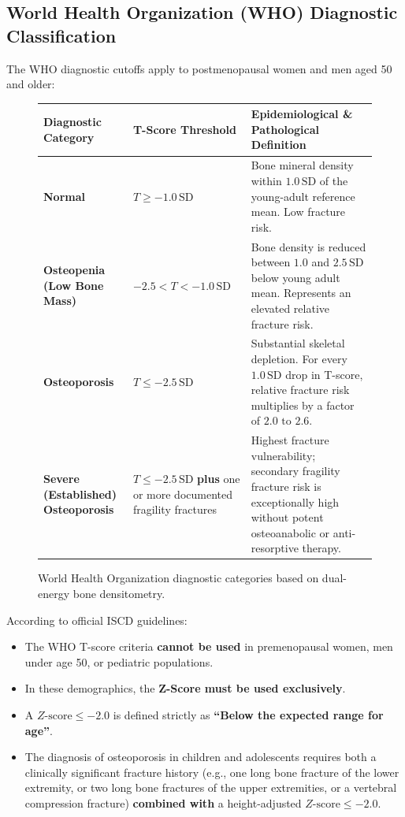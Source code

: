 \documentclass[11pt,a4paper]{article}
\begin{document}
\subsection{World Health Organization (WHO) Diagnostic Classification}

The WHO diagnostic cutoffs apply to postmenopausal women and men aged 50 and older:

\begin{figure}[htbp]
\centering
\setlength{\tabcolsep}{4pt}
\begin{tabular}{p{3.8cm}p{4.2cm}p{6.6cm}}
\toprule
\textbf{Diagnostic Category} & \textbf{T-Score Threshold} & \textbf{Epidemiological \& Pathological Definition} \\
\midrule
\textbf{Normal} & $T \ge -1.0\,\text{SD}$ & Bone mineral density within $1.0\,\text{SD}$ of the young-adult reference mean. Low fracture risk. \\
\addlinespace
\textbf{Osteopenia (Low Bone Mass)} & $-2.5 < T < -1.0\,\text{SD}$ & Bone density is reduced between $1.0$ and $2.5\,\text{SD}$ below young adult mean. Represents an elevated relative fracture risk. \\
\addlinespace
\textbf{Osteoporosis} & $T \le -2.5\,\text{SD}$ & Substantial skeletal depletion. For every $1.0\,\text{SD}$ drop in T-score, relative fracture risk multiplies by a factor of $2.0\text{ to }2.6$. \\
\addlinespace
\textbf{Severe (Established) Osteoporosis} & $T \le -2.5\,\text{SD}$ \textbf{plus} one or more documented fragility fractures & Highest fracture vulnerability; secondary fragility fracture risk is exceptionally high without potent osteoanabolic or anti-resorptive therapy. \\
\bottomrule
\end{tabular}
\caption{World Health Organization diagnostic categories based on dual-energy bone densitometry.}
\label{tab:who_classification}
\end{figure}

\begin{clinicalpearl}
According to official ISCD guidelines:
\begin{itemize}[leftmargin=*]
    \item The WHO T-score criteria \textbf{cannot be used} in premenopausal women, men under age 50, or pediatric populations.
    \item In these demographics, the \textbf{Z-Score must be used exclusively}.
    \item A $Z\text{-score} \le -2.0$ is defined strictly as \textbf{``Below the expected range for age''}.
    \item The diagnosis of osteoporosis in children and adolescents requires both a clinically significant fracture history (e.g., one long bone fracture of the lower extremity, or two long bone fractures of the upper extremities, or a vertebral compression fracture) \textbf{combined with} a height-adjusted $Z\text{-score} \le -2.0$.
\end{itemize}
\end{clinicalpearl}
\end{document}
